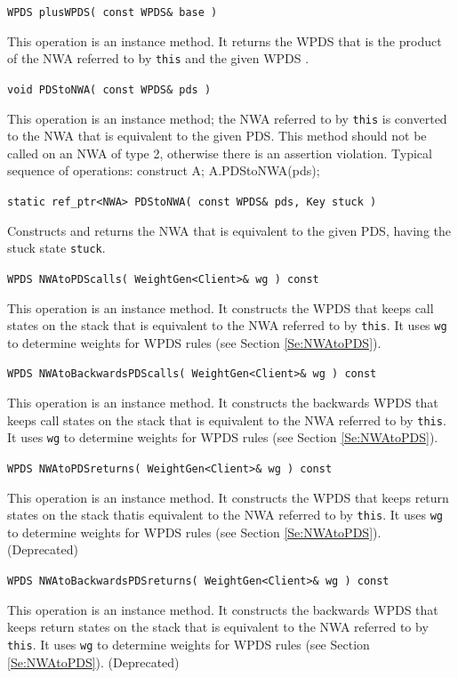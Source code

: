 \documentclass{llncs}
\begin{document}
\begin{description}

  \item\texttt{WPDS plusWPDS( const WPDS\& base )} \nopagebreak

    This operation is an instance method.  It returns the WPDS that is the product of the NWA referred to by \texttt{this} and the given WPDS \cite{advancedquerying}.

  \item\texttt{void PDStoNWA( const WPDS\& pds )} \nopagebreak

    This operation is an instance method; the NWA referred to by \texttt{this} is converted to the NWA that is equivalent to the given PDS.  This method should not be called on an NWA of type 2, otherwise there is an assertion violation.  Typical sequence of operations: construct A; A.PDStoNWA(pds);

  \item\texttt{static ref\_ptr<NWA> PDStoNWA( const WPDS\& pds, Key stuck )} \nopagebreak

    Constructs and returns the NWA that is equivalent to the given PDS, having the stuck state \texttt{stuck}.

  \item\texttt{WPDS NWAtoPDScalls( WeightGen<Client>\& wg ) const} \nopagebreak

    This operation is an instance method.  It constructs the WPDS that keeps call states on the stack that is equivalent to the NWA referred to by \texttt{this}.  It uses \texttt{wg} to determine weights for WPDS rules (see Section \ref{Se:NWAtoPDS}).

  \item\texttt{WPDS NWAtoBackwardsPDScalls( WeightGen<Client>\& wg ) const} \nopagebreak

    This operation is an instance method.  It constructs the backwards WPDS that keeps call states on the stack that is equivalent to the NWA referred to by \texttt{this}.  It uses \texttt{wg} to determine weights for WPDS rules (see Section \ref{Se:NWAtoPDS}).

  \item\texttt{WPDS NWAtoPDSreturns( WeightGen<Client>\& wg ) const} \nopagebreak

    This operation is an instance method.  It constructs the WPDS that keeps return states on the stack thatis equivalent to the NWA referred to by \texttt{this}.  It uses \texttt{wg} to determine weights for WPDS rules (see Section \ref{Se:NWAtoPDS}).  (Deprecated)

  \item\texttt{WPDS NWAtoBackwardsPDSreturns( WeightGen<Client>\& wg ) const} \nopagebreak

    This operation is an instance method.  It constructs the backwards WPDS that keeps return states on the stack that is equivalent to the NWA referred to by \texttt{this}.  It uses \texttt{wg} to determine weights for WPDS rules (see Section \ref{Se:NWAtoPDS}).  (Deprecated) \\

\end{description}
\end{document}
